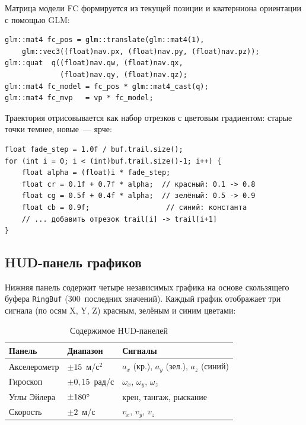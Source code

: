 Матрица модели FC формируется из текущей позиции и кватерниона ориентации с
помощью GLM:
 
\begin{lstlisting}[caption={Матрица модели из позиции и кватерниона}]
glm::mat4 fc_pos = glm::translate(glm::mat4(1),
    glm::vec3((float)nav.px, (float)nav.py, (float)nav.pz));
glm::quat  q((float)nav.qw, (float)nav.qx,
             (float)nav.qy, (float)nav.qz);
glm::mat4 fc_model = fc_pos * glm::mat4_cast(q);
glm::mat4 fc_mvp   = vp * fc_model;
\end{lstlisting}
 
Траектория отрисовывается как набор отрезков с цветовым градиентом: старые
точки темнее, новые~--- ярче:
 
\begin{lstlisting}[caption={Траектория с цветовым затуханием}]
float fade_step = 1.0f / buf.trail.size();
for (int i = 0; i < (int)buf.trail.size()-1; i++) {
    float alpha = (float)i * fade_step;
    float cr = 0.1f + 0.7f * alpha;  // красный: 0.1 -> 0.8
    float cg = 0.5f + 0.4f * alpha;  // зелёный: 0.5 -> 0.9
    float cb = 0.9f;                  // синий: константа
    // ... добавить отрезок trail[i] -> trail[i+1]
}
\end{lstlisting}
 
\subsection{HUD-панель графиков}
 
Нижняя панель содержит четыре независимых графика на основе скользящего
буфера \texttt{RingBuf} (300~последних значений). Каждый график отображает
три сигнала (по осям X, Y, Z) красным, зелёным и синим цветами:
 
\begin{table}[H]
\centering
\caption{Содержимое HUD-панелей}
\label{tab:hud}
\begin{tabularx}{\textwidth}{|>{\centering\arraybackslash}p{3cm}|
                               >{\centering\arraybackslash}p{3cm}|
                               X|}
\hline
\textbf{Панель} & \textbf{Диапазон} & \textbf{Сигналы} \\
\hline
Акселерометр & $\pm15$~м/с$^2$ & $a_x$ (кр.), $a_y$ (зел.), $a_z$ (синий) \\
\hline
Гироскоп     & $\pm0{,}15$~рад/с & $\omega_x$, $\omega_y$, $\omega_z$ \\
\hline
Углы Эйлера  & $\pm180{}^\circ$   & крен, тангаж, рыскание \\
\hline
Скорость     & $\pm2$~м/с        & $v_x$, $v_y$, $v_z$ \\
\hline
\end{tabularx}
\end{table}
 
